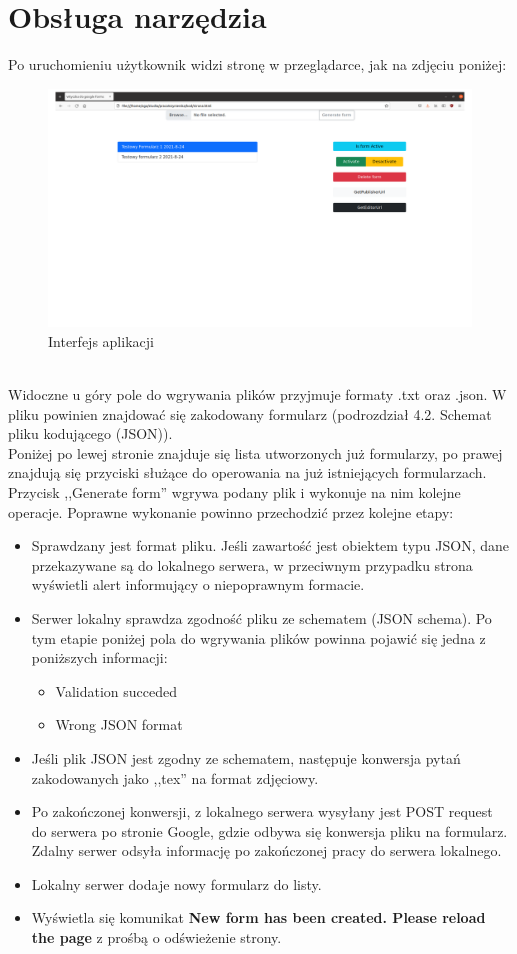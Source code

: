 \section{Obsługa narzędzia}
Po uruchomieniu użytkownik widzi stronę w przeglądarce, jak na zdjęciu poniżej:
\begin{figure}[H]
  \includegraphics{strona.png}
  \caption{Interfejs aplikacji}
  \label{fig:1}
\end{figure}
\\Widoczne u góry pole do wgrywania plików przyjmuje formaty .txt oraz .json. W pliku powinien znajdować się zakodowany formularz (podrozdział 4.2. Schemat pliku kodującego (JSON)).
\\Poniżej  po lewej stronie znajduje się lista utworzonych już formularzy, po prawej znajdują się przyciski służące do operowania na już istniejących formularzach.
\\Przycisk ,,Generate form'' wgrywa podany plik i  wykonuje na nim kolejne operacje. Poprawne wykonanie powinno przechodzić przez kolejne etapy:
\begin{itemize}
\item Sprawdzany jest format  pliku. Jeśli zawartość jest obiektem typu JSON, dane przekazywane są do lokalnego serwera, w przeciwnym przypadku strona wyświetli alert informujący o niepoprawnym formacie.
\item Serwer lokalny sprawdza zgodność pliku ze schematem (JSON schema). Po tym etapie poniżej pola do wgrywania plików powinna pojawić się jedna z poniższych informacji:
\begin{itemize}
\item Validation succeded
\item Wrong JSON format
\end{itemize}
\item Jeśli plik JSON jest zgodny ze schematem, następuje konwersja pytań zakodowanych jako ,,tex'' na format zdjęciowy. 
\item Po zakończonej konwersji, z lokalnego serwera wysyłany jest POST request do serwera po stronie Google, gdzie odbywa się konwersja pliku na formularz. Zdalny serwer odsyła informację po zakończonej pracy do serwera lokalnego.
\item Lokalny serwer dodaje nowy formularz do listy.
\item Wyświetla się komunikat \textbf{New form has been created. Please reload the page} z prośbą o odświeżenie strony.
\end{itemize}

